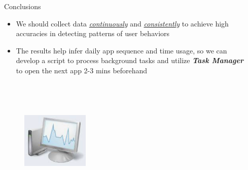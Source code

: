 \documentclass[final]{beamer}
\newlength{\sepwidth}
\newlength{\colwidth}
\newcommand{\separatorcolumn}{\begin{column}{\sepwidth}\end{column}}
\begin{document}
\begin{frame}[t]
\begin{columns}[t]
\begin{column}{\colwidth}
      \begin{block} {\huge{Conclusions}}     
        {
          \fontsize{37pt}{44.4pt} \selectfont
                \begin{itemize} 
                  \item We should collect data \underline{\textit{continuously}} and \underline{\textit{consistently}} to achieve high accuracies in detecting patterns of user behaviors
                  \item The results help infer daily app sequence and time usage, so we can develop a script to process background tasks and utilize \textbf{\textit{Task Manager}} to open the next app 2-3 mins beforehand 
                \end{itemize}
        }
        \begin{figure}\includegraphics[width=0.3\textwidth, height=6cm]{task_manager.jpeg}\end{figure}
      \end{block}

    \end{column}

    \separatorcolumn
  \end{columns}
\end{frame}
\end{document}
